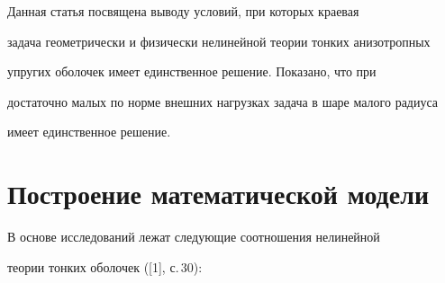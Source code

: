  


\date{} 




\pagestyle{plain} %


 




\maketitle 


\label{begin} 


 


 


 


Данная статья посвящена выводу условий, при которых краевая 


задача геометрически и физически нелинейной теории тонких анизотропных 


упругих оболочек имеет единственное решение. Показано, что при 


достаточно малых по норме внешних нагрузках задача в шаре малого радиуса 


имеет единственное решение. 


 


 


\section{Построение математической модели} 


 


В основе исследований лежат следующие соотношения нелинейной 


теории тонких оболочек ([1], с.\,30): 



